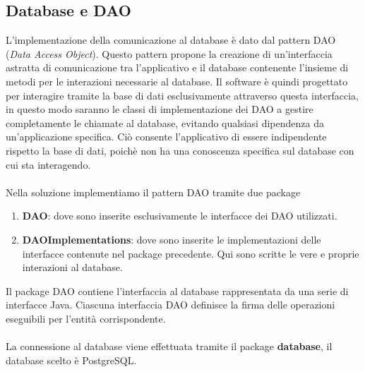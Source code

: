 \documentclass{article}
\begin{document}
	\subsection{Database e DAO}
	L'implementazione della comunicazione al database è dato dal pattern DAO (\textit{Data Access Object}). Questo pattern propone la creazione di un'interfaccia astratta di comunicazione tra l'applicativo e il database contenente l'insieme di metodi per le interazioni necessarie al database. Il software è quindi progettato per interagire tramite la base di dati esclusivamente attraverso questa interfaccia, in questo modo saranno le classi di implementazione dei DAO a gestire completamente le chiamate al database, evitando qualsiasi dipendenza da un'applicazione specifica. Ciò consente l'applicativo di essere indipendente rispetto la base di dati, poichè non ha una conoscenza specifica sul database con cui sta interagendo.
	\\\\
	Nella soluzione implementiamo il pattern DAO tramite due package
	\begin{enumerate}
		\item \textbf{DAO}: dove sono inserite esclusivamente le interfacce dei DAO utilizzati.
		\item \textbf{DAOImplementations}: dove sono inserite le implementazioni delle interfacce contenute nel package precedente. Qui sono scritte le vere e proprie interazioni al database.
	\end{enumerate}
	
	Il package DAO contiene l'interfaccia al database rappresentata da una serie di interfacce Java. Ciascuna interfaccia DAO definisce la firma delle operazioni eseguibili per l'entità corrispondente.
	\\\\
	La connessione al database viene effettuata tramite il package \textbf{database}, il database scelto \`e PostgreSQL.
	
	
	\newpage
	
\end{document}
